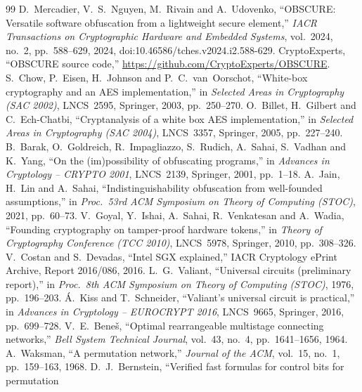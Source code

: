 \documentclass[12pt,a4paper,oneside]{report}
\begin{document}
\clearpage
{}
{}
\renewcommand{\bibname}{References}
\begingroup\small{}
\begin{thebibliography}{99}
\setlength{\itemsep}{1pt}
 D.~Mercadier, V.~S.~Nguyen, M.~Rivain and A.~Udovenko, ``OBSCURE: Versatile
  software obfuscation from a lightweight secure element,'' \emph{IACR Transactions on
  Cryptographic Hardware and Embedded Systems}, vol.~2024, no.~2, pp.~588--629, 2024,
  doi:10.46586/tches.v2024.i2.588-629.
 CryptoExperts, ``OBSCURE source code,''
  \url{https://github.com/CryptoExperts/OBSCURE}.
 S.~Chow, P.~Eisen, H.~Johnson and P.~C.~van~Oorschot, ``White-box cryptography and
  an AES implementation,'' in \emph{Selected Areas in Cryptography (SAC 2002)}, LNCS~2595,
  Springer, 2003, pp.~250--270.
 O.~Billet, H.~Gilbert and C.~Ech-Chatbi, ``Cryptanalysis of a white box AES
  implementation,'' in \emph{Selected Areas in Cryptography (SAC 2004)}, LNCS~3357, Springer,
  2005, pp.~227--240.
 B.~Barak, O.~Goldreich, R.~Impagliazzo, S.~Rudich, A.~Sahai, S.~Vadhan and
  K.~Yang, ``On the (im)possibility of obfuscating programs,'' in \emph{Advances in Cryptology --
  CRYPTO 2001}, LNCS~2139, Springer, 2001, pp.~1--18.
 A.~Jain, H.~Lin and A.~Sahai, ``Indistinguishability obfuscation from well-founded
  assumptions,'' in \emph{Proc.\ 53rd ACM Symposium on Theory of Computing (STOC)}, 2021,
  pp.~60--73.
 V.~Goyal, Y.~Ishai, A.~Sahai, R.~Venkatesan and A.~Wadia, ``Founding cryptography
  on tamper-proof hardware tokens,'' in \emph{Theory of Cryptography Conference (TCC 2010)},
  LNCS~5978, Springer, 2010, pp.~308--326.
 V.~Costan and S.~Devadas, ``Intel SGX explained,'' IACR Cryptology ePrint Archive,
  Report 2016/086, 2016.
 L.~G.~Valiant, ``Universal circuits (preliminary report),'' in \emph{Proc.\
  8th ACM Symposium on Theory of Computing (STOC)}, 1976, pp.~196--203.
\bibitem{ks16} \'A.~Kiss and T.~Schneider, ``Valiant's universal circuit is practical,'' in
  \emph{Advances in Cryptology -- EUROCRYPT 2016}, LNCS~9665, Springer, 2016, pp.~699--728.
\bibitem{benes} V.~E.~Bene\v{s}, ``Optimal rearrangeable multistage connecting networks,''
  \emph{Bell System Technical Journal}, vol.~43, no.~4, pp.~1641--1656, 1964.
\bibitem{waksman} A.~Waksman, ``A permutation network,'' \emph{Journal of the ACM}, vol.~15,
  no.~1, pp.~159--163, 1968.
 D.~J.~Bernstein, ``Verified fast formulas for control bits for permutation

\end{thebibliography}
\end{document}

